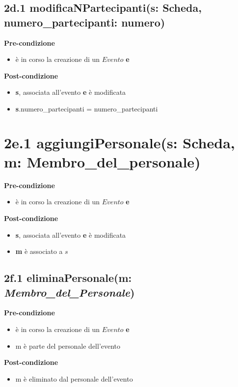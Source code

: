 \documentclass[12pt]{extarticle}
\begin{document}
\subsection*{2d.1 modificaNPartecipanti(s: Scheda, numero\_partecipanti: numero)}

\textbf{Pre-condizione}
\begin{itemize}
  \item è in corso la creazione di un $Evento$ \textbf{e}
\end{itemize} 
\textbf{Post-condizione}
\begin{itemize}
  \item \textbf{s}, associata all'evento \textbf{e} è modificata
  \item \textbf{s}.numero\_partecipanti = numero\_partecipanti
\end{itemize} 

\section*{2e.1 aggiungiPersonale(s: Scheda, m: Membro\_del\_personale)}

\textbf{Pre-condizione}
\begin{itemize}
  \item è in corso la creazione di un $Evento$ \textbf{e}
\end{itemize}
\textbf{Post-condizione}
\begin{itemize}
  \item \textbf{s}, associata all'evento \textbf{e} è modificata
  \item \textbf{m} è associato a $s$
\end{itemize}

\subsection*{2f.1 eliminaPersonale(m: \textit{Membro\_del\_Personale})}

\textbf{Pre-condizione}
\begin{itemize}
  \item è in corso la creazione di un $Evento$ \textbf{e}
  \item m è parte del personale dell'evento
\end{itemize}
\textbf{Post-condizione}
\begin{itemize}
  \item m è eliminato dal personale dell'evento
\end{itemize}
\end{document}
